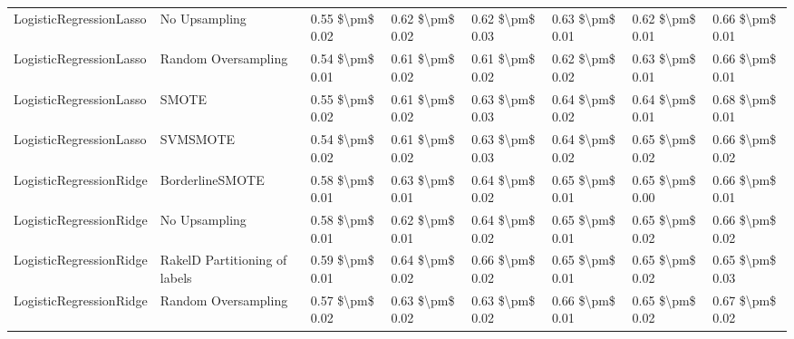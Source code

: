 \begin{tabular}{llllllll}
        LogisticRegressionLasso &                 No Upsampling & 0.55 \$\textbackslash pm\$ 0.02 &           0.62 \$\textbackslash pm\$ 0.02 &       0.62 \$\textbackslash pm\$ 0.03 &        0.63 \$\textbackslash pm\$ 0.01 &                         0.62 \$\textbackslash pm\$ 0.01 &     0.66 \$\textbackslash pm\$ 0.01 \\
        LogisticRegressionLasso &           Random Oversampling & 0.54 \$\textbackslash pm\$ 0.01 &           0.61 \$\textbackslash pm\$ 0.02 &       0.61 \$\textbackslash pm\$ 0.02 &        0.62 \$\textbackslash pm\$ 0.02 &                         0.63 \$\textbackslash pm\$ 0.01 &     0.66 \$\textbackslash pm\$ 0.01 \\
        LogisticRegressionLasso &                         SMOTE & 0.55 \$\textbackslash pm\$ 0.02 &           0.61 \$\textbackslash pm\$ 0.02 &       0.63 \$\textbackslash pm\$ 0.03 &        0.64 \$\textbackslash pm\$ 0.02 &                         0.64 \$\textbackslash pm\$ 0.01 &     0.68 \$\textbackslash pm\$ 0.01 \\
        LogisticRegressionLasso &                      SVMSMOTE & 0.54 \$\textbackslash pm\$ 0.02 &           0.61 \$\textbackslash pm\$ 0.02 &       0.63 \$\textbackslash pm\$ 0.03 &        0.64 \$\textbackslash pm\$ 0.02 &                         0.65 \$\textbackslash pm\$ 0.02 &     0.66 \$\textbackslash pm\$ 0.02 \\
        LogisticRegressionRidge &               BorderlineSMOTE & 0.58 \$\textbackslash pm\$ 0.01 &           0.63 \$\textbackslash pm\$ 0.01 &       0.64 \$\textbackslash pm\$ 0.02 &        0.65 \$\textbackslash pm\$ 0.01 &                         0.65 \$\textbackslash pm\$ 0.00 &     0.66 \$\textbackslash pm\$ 0.01 \\
        LogisticRegressionRidge &                 No Upsampling & 0.58 \$\textbackslash pm\$ 0.01 &           0.62 \$\textbackslash pm\$ 0.01 &       0.64 \$\textbackslash pm\$ 0.02 &        0.65 \$\textbackslash pm\$ 0.01 &                         0.65 \$\textbackslash pm\$ 0.02 &     0.66 \$\textbackslash pm\$ 0.02 \\
        LogisticRegressionRidge & RakelD Partitioning of labels & 0.59 \$\textbackslash pm\$ 0.01 &           0.64 \$\textbackslash pm\$ 0.02 &       0.66 \$\textbackslash pm\$ 0.02 &        0.65 \$\textbackslash pm\$ 0.01 &                         0.65 \$\textbackslash pm\$ 0.02 &     0.65 \$\textbackslash pm\$ 0.03 \\
        LogisticRegressionRidge &           Random Oversampling & 0.57 \$\textbackslash pm\$ 0.02 &           0.63 \$\textbackslash pm\$ 0.02 &       0.63 \$\textbackslash pm\$ 0.02 &        0.66 \$\textbackslash pm\$ 0.01 &                         0.65 \$\textbackslash pm\$ 0.02 &     0.67 \$\textbackslash pm\$ 0.02 \\

\end{tabular}
